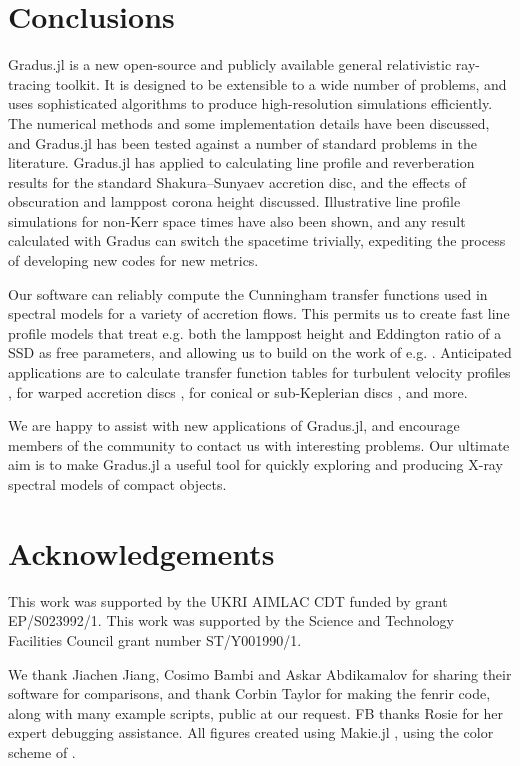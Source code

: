 \documentclass[fleqn,usenatbib]{mnras}
\newcommand{\software}[1]{{\sc #1}}
\newcommand{\Gradus}{\software{Gradus.jl}\xspace}
\begin{document}
\section{Conclusions}
\label{sec:conclusion}

\Gradus is a new open-source and publicly available general relativistic
ray-tracing toolkit. It is designed to be extensible to a wide number of
problems, and uses sophisticated algorithms to produce high-resolution
simulations efficiently. The numerical methods and some implementation details
have been discussed, and \Gradus has been tested against a number of standard
problems in the literature. \Gradus has applied to calculating line profile and
reverberation results for the standard Shakura--Sunyaev accretion disc, and the
effects of obscuration and lamppost corona height discussed. Illustrative line
profile simulations for non-Kerr space times have also been shown, and any
result calculated with Gradus can switch the spacetime trivially, expediting
the process of developing new codes for new metrics.

Our software can reliably compute the Cunningham transfer functions used in
spectral models for a variety of accretion flows. This permits us to create fast
line profile models that treat e.g. both the lamppost height and Eddington ratio
of a SSD as free parameters, and allowing us to build on the work of e.g.
\citet{jiang_black_20222}. Anticipated applications are to calculate transfer
function tables for turbulent velocity profiles \citep{pariev_line_1998}, for
warped accretion discs \citep[e.g.][]{hartnoll_reprocessed_2001}, for conical or
sub-Keplerian discs \citep[e.g.][]{wu_iron_2007}, and more.

We are happy to assist with new applications of \Gradus, and encourage members
of the community to contact us with interesting problems. Our ultimate aim is to
make \Gradus a useful tool for quickly exploring and producing X-ray spectral
models of compact objects.

\section*{Acknowledgements}
This work was supported by the UKRI AIMLAC CDT funded by grant EP/S023992/1. This
work was supported by the Science and Technology Facilities Council grant number
ST/Y001990/1.

We thank Jiachen Jiang, Cosimo Bambi and Askar Abdikamalov for sharing their
software for comparisons, and thank Corbin Taylor for making the \software{fenrir}
code, along with many example scripts, public at our request. FB thanks Rosie
for her expert debugging assistance. All figures created using Makie.jl
\citep{DanischKrumbiegel2021}, using the color scheme of
\citet{wong_points_2011}.
\end{document}
